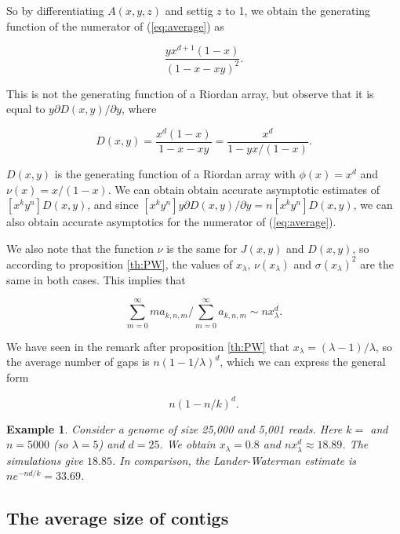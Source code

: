 \documentclass{article}
\newtheorem{example}{Example}
\begin{document}
So by differentiating $A(x,y,z)$ and settig $z$ to 1, we obtain the
generating function of the numerator of (\ref{eq:average}) as

\begin{equation*}
\frac{yx^{d+1}(1-x)}{\left(1-x-xy\right)^2}.
\end{equation*}

This is not the generating function of a Riordan array, but observe that
it is equal to $y\partial D(x,y)/\partial y$, where

\begin{equation*}
D(x,y) = \frac{x^d(1-x)}{1-x-xy} =
\frac{x^d}{1-yx/(1-x)}.
\end{equation*}

$D(x,y)$ is the generating function of a Riordan array with $\phi(x) =
x^d$ and $\nu(x) = x/(1-x)$. We can obtain obtain accurate asymptotic
estimates of $[x^ky^n]D(x,y)$, and since $[x^ky^n]y\partial D(x,y) /
\partial y = n[x^ky^n]D(x,y)$, we can also obtain accurate asymptotics for
the numerator of (\ref{eq:average}).

We also note that the function $\nu$ is the same for $J(x,y)$ and
$D(x,y)$, so according to proposition \ref{th:PW}, the values of
$x_\lambda$, $\nu(x_\lambda)$ and $\sigma(x_\lambda)^2$ are the same in
both cases. This implies that

\begin{equation*}
\sum_{m=0}^\infty ma_{k,n,m}\Big/\sum_{m=0}^\infty a_{k,n,m} \sim
n x_\lambda^d.
\end{equation*}

We have seen in the remark after proposition \ref{th:PW} that $x_\lambda =
(\lambda-1)/\lambda$, so the average number of gaps is $n(1-1/\lambda)^d$,
which we can express the general form

\begin{equation*}
n\left(1-n/k\right)^d.
\end{equation*}

\begin{example}
Consider a genome of size 25,000 and 5,001 reads. Here $k = $ and $n =
5000$ (so $\lambda = 5$) and $d = 25$. We obtain $x_\lambda = 0.8$
and $n x_\lambda^d \approx 18.89$. The simulations give
$18.85$. In comparison, the Lander-Waterman estimate is $ne^{-nd/k} =
33.69$.
\end{example}

\subsection{The average size of contigs}
\end{document}
